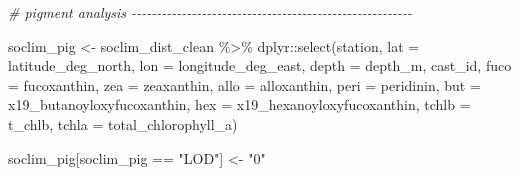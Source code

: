 \documentclass[
]{article}
\newenvironment{Shaded}{\begin{snugshade}}{\end{snugshade}}
\newcommand{\CommentTok}[1]{\textcolor[rgb]{0.56,0.35,0.01}{\textit{#1}}}
\newcommand{\FunctionTok}[1]{\textcolor[rgb]{0.00,0.00,0.00}{#1}}
\newcommand{\NormalTok}[1]{#1}
\newcommand{\OtherTok}[1]{\textcolor[rgb]{0.56,0.35,0.01}{#1}}
\newcommand{\SpecialCharTok}[1]{\textcolor[rgb]{0.00,0.00,0.00}{#1}}
\newcommand{\StringTok}[1]{\textcolor[rgb]{0.31,0.60,0.02}{#1}}
\begin{document}
\begin{Shaded}
\begin{Highlighting}[]
\CommentTok{\# pigment analysis {-}{-}{-}{-}{-}{-}{-}{-}{-}{-}{-}{-}{-}{-}{-}{-}{-}{-}{-}{-}{-}{-}{-}{-}{-}{-}{-}{-}{-}{-}{-}{-}{-}{-}{-}{-}{-}{-}{-}{-}{-}{-}{-}{-}{-}{-}{-}{-}{-}{-}{-}{-}{-}{-}{-}{-}}

\NormalTok{soclim\_pig }\OtherTok{\textless{}{-}}\NormalTok{ soclim\_dist\_clean }\SpecialCharTok{\%\textgreater{}\%}\NormalTok{ dplyr}\SpecialCharTok{::}\FunctionTok{select}\NormalTok{(station, }\StringTok{\textquotesingle{}lat\textquotesingle{}} \OtherTok{=}\NormalTok{ latitude\_deg\_north,}
                                       \StringTok{\textquotesingle{}lon\textquotesingle{}} \OtherTok{=}\NormalTok{ longitude\_deg\_east,}
                                      \StringTok{\textquotesingle{}depth\textquotesingle{}} \OtherTok{=}\NormalTok{ depth\_m,}
\NormalTok{                                      cast\_id,}
                                      \StringTok{\textquotesingle{}fuco\textquotesingle{}} \OtherTok{=}\NormalTok{ fucoxanthin,}
                                      \StringTok{\textquotesingle{}zea\textquotesingle{}} \OtherTok{=}\NormalTok{ zeaxanthin,}
                                      \StringTok{\textquotesingle{}allo\textquotesingle{}} \OtherTok{=}\NormalTok{ alloxanthin,}
                                      \StringTok{\textquotesingle{}peri\textquotesingle{}} \OtherTok{=}\NormalTok{ peridinin,}
                                      \StringTok{\textquotesingle{}but\textquotesingle{}} \OtherTok{=}\NormalTok{ x19\_butanoyloxyfucoxanthin,}
                                      \StringTok{\textquotesingle{}hex\textquotesingle{}} \OtherTok{=}\NormalTok{ x19\_hexanoyloxyfucoxanthin,}
                                      \StringTok{\textquotesingle{}tchlb\textquotesingle{}} \OtherTok{=}\NormalTok{ t\_chlb,}
                                      \StringTok{\textquotesingle{}tchla\textquotesingle{}} \OtherTok{=}\NormalTok{ total\_chlorophyll\_a)}

\NormalTok{soclim\_pig[soclim\_pig }\SpecialCharTok{==} \StringTok{"LOD"}\NormalTok{] }\OtherTok{\textless{}{-}} \StringTok{"0"}
  

\end{Highlighting}
\end{Shaded}
\end{document}
